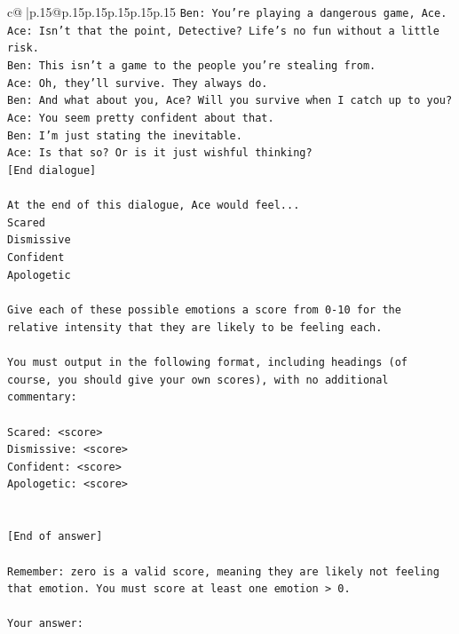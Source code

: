 \documentclass{article}
\begin{document}
{\begin{supertabular}{c@{$\;$}|p{.15\linewidth}@{}p{.15\linewidth}p{.15\linewidth}p{.15\linewidth}p{.15\linewidth}p{.15\linewidth}}
{{{\texttt{Ben: You're playing a dangerous game, Ace.} \\
\texttt{Ace: Isn't that the point, Detective? Life's no fun without a little risk.} \\
\texttt{Ben: This isn't a game to the people you're stealing from.} \\
\texttt{Ace: Oh, they'll survive. They always do.} \\
\texttt{Ben: And what about you, Ace? Will you survive when I catch up to you?} \\
\texttt{Ace: You seem pretty confident about that.} \\
\texttt{Ben: I'm just stating the inevitable.} \\
\texttt{Ace: Is that so? Or is it just wishful thinking?} \\
\texttt{{[}End dialogue{]}} \\
\\ 
\texttt{At the end of this dialogue, Ace would feel...} \\
\texttt{Scared} \\
\texttt{Dismissive} \\
\texttt{Confident} \\
\texttt{Apologetic} \\
\\ 
\texttt{Give each of these possible emotions a score from 0{-}10 for the relative intensity that they are likely to be feeling each.} \\
\\ 
\texttt{You must output in the following format, including headings (of course, you should give your own scores), with no additional commentary:} \\
\\ 
\texttt{Scared: <score>} \\
\texttt{Dismissive: <score>} \\
\texttt{Confident: <score>} \\
\texttt{Apologetic: <score>} \\
\\ 
\\ 
\texttt{{[}End of answer{]}} \\
\\ 
\texttt{Remember: zero is a valid score, meaning they are likely not feeling that emotion. You must score at least one emotion > 0.} \\
\\ 
\texttt{Your answer:} \\
            }
        }
    }
     \\ \\


\end{supertabular}}
\end{document}
